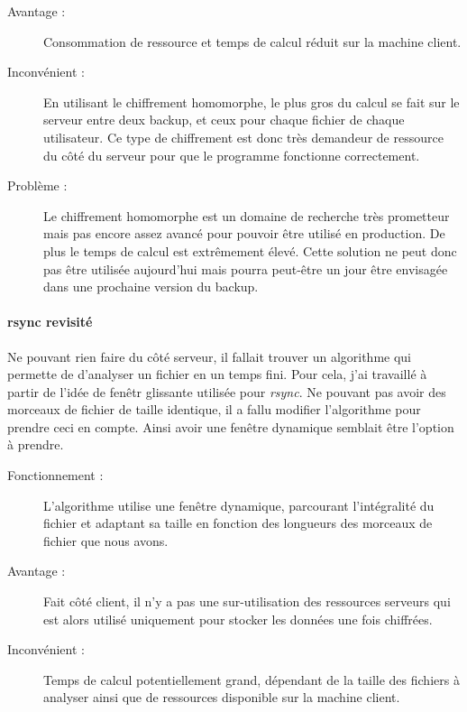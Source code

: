 \documentclass[a4paper,10pt, twoside]{report}
\begin{document}
\begin{spacing}{1.2}
\begin{description}
 \item [Avantage :] Consommation de ressource et temps de calcul r\'eduit sur
 la machine client.
 
 \item [Inconv\'enient :] En utilisant le chiffrement homomorphe, le plus gros
 du calcul se fait sur le serveur entre deux backup, et ceux pour chaque
 fichier de chaque utilisateur. Ce type de chiffrement est donc tr\`es
 demandeur de ressource du c\^ot\'e du serveur pour que le programme fonctionne
 correctement.

 \item [Probl\`eme :] Le chiffrement homomorphe est un domaine de recherche
 tr\`es prometteur mais pas encore assez avanc\'e pour pouvoir \^etre utilis\'e
 en production. De plus le temps de calcul est extr\^emement \'elev\'e. Cette
 solution ne peut donc pas \^etre utilis\'ee aujourd'hui mais pourra peut-\^etre
 un jour \^etre envisag\'ee dans une prochaine version du backup.
\end{description}

\paragraph{rsync revisit\'e\\}
Ne pouvant rien faire du c\^ot\'e serveur, il fallait trouver un algorithme
qui permette de d'analyser un fichier en un temps fini. Pour cela, j'ai
travaill\'e \`a partir de l'id\'ee de fen\^etr glissante utilis\'ee pour
\textit{rsync}. Ne pouvant pas avoir des morceaux de fichier de taille
identique, il a fallu modifier l'algorithme pour prendre ceci en compte. Ainsi
avoir une fen\^etre dynamique semblait \^etre l'option \`a prendre.

\begin{description}
 \item [Fonctionnement :] L'algorithme utilise une fen\^etre dynamique,
 parcourant l'int\'egralit\'e du fichier et adaptant sa taille en fonction
 des longueurs des morceaux de fichier que nous avons.
 
 \item [Avantage :] Fait c\^ot\'e client, il n'y a pas une sur-utilisation
 des ressources serveurs qui est alors utilis\'e uniquement pour stocker
 les donn\'ees une fois chiffr\'ees.
 
 \item [Inconv\'enient :] Temps de calcul potentiellement grand, d\'ependant
 de la taille des fichiers \`a analyser ainsi que de ressources disponible sur
 la machine client.
\end{description}


\end{spacing}
\end{document}
